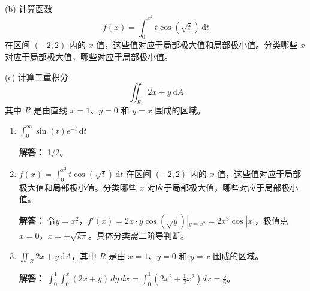 \documentclass[11pt]{article}
\newenvironment{qparts}{\begin{enumerate}[{(}a{)}]}{\end{enumerate}}
\begin{document}
(b) 计算函数
$$
f(x) = \int_0^{x^2} t \cos(\sqrt{t}) \, \mathrm{d}t
$$
在区间 $(-2, 2)$ 内的 $x$ 值，这些值对应于局部极大值和局部极小值。分类哪些 $x$ 对应于局部极大值，哪些对应于局部极小值。

(c) 计算二重积分
$$
\iint_R 2x + y \, \mathrm{d}A
$$
其中 $R$ 是由直线 $x = 1$、$y = 0$ 和 $y = x$ 围成的区域。

\begin{qparts}
\item $\int_0^{\infty} \sin(t) e^{-t} \, \mathrm{d}t$

\textbf{解答：} 1/2。

\item $f(x) = \int_0^{x^2} t \cos(\sqrt{t}) \, \mathrm{d}t$ 在区间 $(-2, 2)$ 内的 $x$ 值，这些值对应于局部极大值和局部极小值。分类哪些 $x$ 对应于局部极大值，哪些对应于局部极小值。

\textbf{解答：} 令$y=x^2$，$f'(x)=2x\cdot y\cos(\sqrt{y})|_{y=x^2}=2x^3\cos|x|$，极值点$x=0$，$x=\pm\sqrt{k\pi}$。具体分类需二阶导判断。

\item $\iint_R 2x + y \, \mathrm{d}A$，其中 $R$ 是由 $x = 1$、$y = 0$ 和 $y = x$ 围成的区域。

\textbf{解答：} $\int_0^1\int_0^x (2x+y)\,dy\,dx=\int_0^1(2x^2+\frac{1}{2}x^2)dx=\frac{5}{6}$。
\end{qparts}
\end{document}
